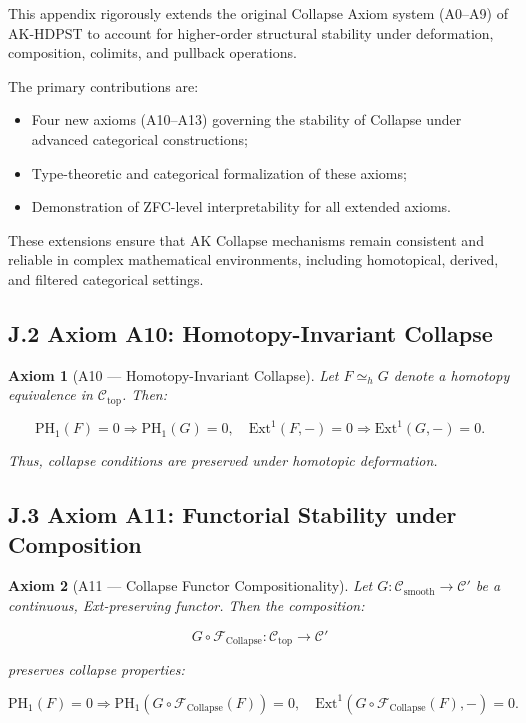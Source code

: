 \documentclass[11pt]{article}
\newtheorem{axiom}{Axiom}[section]
\begin{document}
This appendix rigorously extends the original Collapse Axiom system (A0–A9) of AK-HDPST to account for higher-order structural stability under deformation, composition, colimits, and pullback operations.

The primary contributions are:

\begin{itemize}
    \item Four new axioms (A10–A13) governing the stability of Collapse under advanced categorical constructions;
    \item Type-theoretic and categorical formalization of these axioms;
    \item Demonstration of ZFC-level interpretability for all extended axioms.
\end{itemize}

These extensions ensure that AK Collapse mechanisms remain consistent and reliable in complex mathematical environments, including homotopical, derived, and filtered categorical settings.

\subsection*{J.2 Axiom A10: Homotopy-Invariant Collapse}

\begin{axiom}[A10 — Homotopy-Invariant Collapse]
Let \( F \simeq_h G \) denote a homotopy equivalence in \( \mathcal{C}_{\mathrm{top}} \). Then:

\[
\mathrm{PH}_1(F) = 0 \Rightarrow \mathrm{PH}_1(G) = 0,
\quad \mathrm{Ext}^1(F, -) = 0 \Rightarrow \mathrm{Ext}^1(G, -) = 0.
\]

Thus, collapse conditions are preserved under homotopic deformation.
\end{axiom}

\subsection*{J.3 Axiom A11: Functorial Stability under Composition}

\begin{axiom}[A11 — Collapse Functor Compositionality]
Let \( G : \mathcal{C}_{\mathrm{smooth}} \to \mathcal{C}' \) be a continuous, Ext-preserving functor. Then the composition:

\[
G \circ \mathcal{F}_{\mathrm{Collapse}} : \mathcal{C}_{\mathrm{top}} \to \mathcal{C}'
\]

preserves collapse properties:

\[
\mathrm{PH}_1(F) = 0 \Rightarrow \mathrm{PH}_1(G \circ \mathcal{F}_{\mathrm{Collapse}}(F)) = 0,
\quad \mathrm{Ext}^1(G \circ \mathcal{F}_{\mathrm{Collapse}}(F), -) = 0.
\]
\end{axiom}
\end{document}
